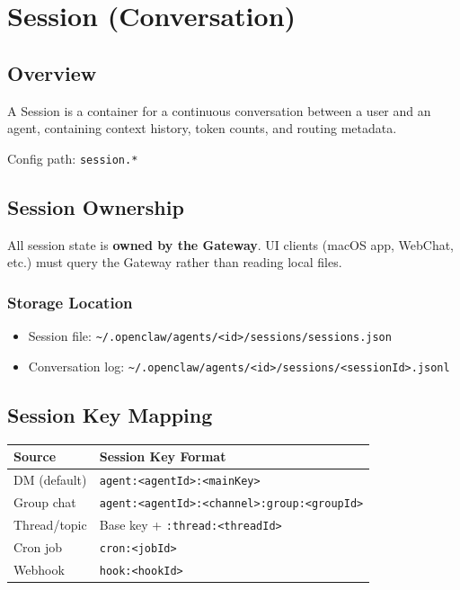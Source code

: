 \chapter{Session (Conversation)}

\section{Overview}

A Session is a container for a continuous conversation between a user and an agent, containing context history, token counts, and routing metadata.

Config path: \texttt{session.*}

\section{Session Ownership}

All session state is \textbf{owned by the Gateway}. UI clients (macOS app, WebChat, etc.) must query the Gateway rather than reading local files.

\subsection{Storage Location}

\begin{itemize}
  \item Session file: \texttt{\textasciitilde{}/.openclaw/agents/<id>/sessions/sessions.json}
  \item Conversation log: \texttt{\textasciitilde{}/.openclaw/agents/<id>/sessions/<sessionId>.jsonl}
\end{itemize}

\section{Session Key Mapping}

\begin{center}
\begin{tabular}{ll}
\toprule
\textbf{Source} & \textbf{Session Key Format} \\
\midrule
DM (default) & \texttt{agent:<agentId>:<mainKey>} \\
Group chat & \texttt{agent:<agentId>:<channel>:group:<groupId>} \\
Thread/topic & Base key + \texttt{:thread:<threadId>} \\
Cron job & \texttt{cron:<jobId>} \\
Webhook & \texttt{hook:<hookId>} \\
\bottomrule
\end{tabular}
\end{center}

